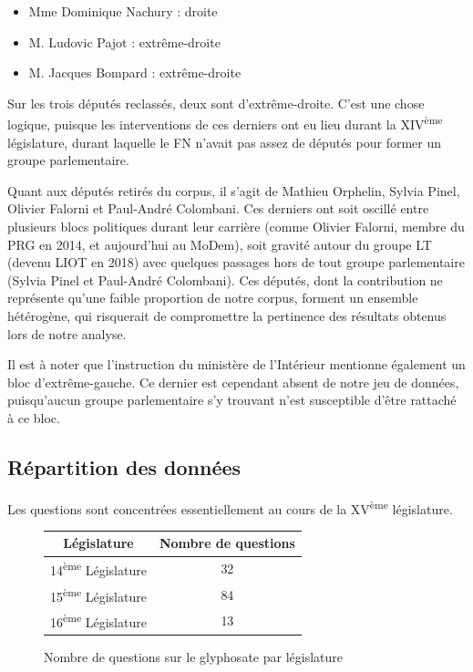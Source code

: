 \documentclass[12pt,twocolumn,landscape]{article}
\begin{document}
    \begin{itemize}
        \item Mme Dominique Nachury : droite
        \item M. Ludovic Pajot : extrême-droite
        \item M. Jacques Bompard : extrême-droite
    \end{itemize}

    Sur les trois députés reclassés, deux sont d'extrême-droite.
    C'est une chose logique, puisque les interventions de ces derniers
    ont eu lieu durant la XIV\textsuperscript{ème} législature,
    durant laquelle le FN n'avait pas assez de députés pour former
    un groupe parlementaire.

    Quant aux députés retirés du corpus, il s'agit de
    Mathieu Orphelin, Sylvia Pinel, Olivier Falorni et Paul-André Colombani.
    Ces derniers ont soit oscillé entre plusieurs blocs politiques durant leur
    carrière (comme Olivier Falorni, membre du PRG en 2014, et aujourd'hui au MoDem),
    soit gravité autour du groupe LT (devenu LIOT en 2018) avec quelques
    passages hors de tout groupe parlementaire (Sylvia Pinel et Paul-André Colombani).
    Ces députés, dont la contribution ne représente qu'une faible
    proportion de notre corpus, forment un ensemble hétérogène, qui
    risquerait de compromettre la pertinence des résultats obtenus lors de notre analyse.

    Il est à noter que l'instruction du ministère de l'Intérieur
    mentionne également un bloc d'extrême-gauche.
    Ce dernier est cependant absent de notre jeu de données,
    puisqu'aucun groupe parlementaire s'y trouvant n'est susceptible
    d'être rattaché à ce bloc.

    \subsection{Répartition des données}\label{subsec:repartition-des-donnees}

    Les questions sont concentrées essentiellement au cours de la
    XV\textsuperscript{ème} législature.


    \begin{figure}[h]
        \centering
        \begin{tabular}{cc}
            \toprule
            Législature                         & Nombre de questions \\
            \midrule
            14\textsuperscript{ème} Législature & 32                  \\
            15\textsuperscript{ème} Législature & 84                  \\
            16\textsuperscript{ème} Législature & 13                  \\
            \bottomrule
        \end{tabular}
        \caption{Nombre de questions sur le glyphosate par législature}
        \label{fig:glypho-nb-questions}
    \end{figure}
\end{document}
